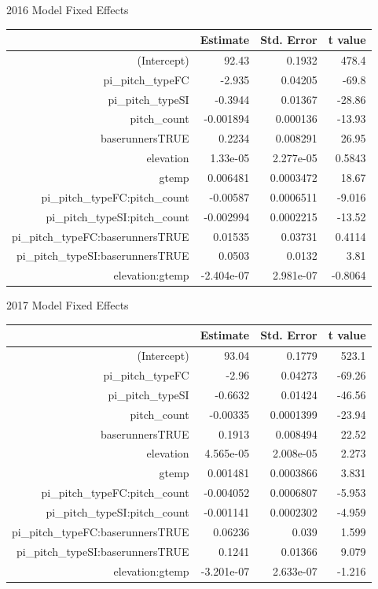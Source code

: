 \documentclass[letterpaper,12pt]{article}\usepackage[]{graphicx}\usepackage[]{color}
\begin{document}
2016 Model Fixed Effects
\begin{table}[ht]
\centering
\begin{tabular}{rrrr}
  \hline
 & Estimate & Std. Error & t value \\ 
  \hline
(Intercept) & 92.43 & 0.1932 & 478.4 \\ 
  pi\_pitch\_typeFC & -2.935 & 0.04205 & -69.8 \\ 
  pi\_pitch\_typeSI & -0.3944 & 0.01367 & -28.86 \\ 
  pitch\_count & -0.001894 & 0.000136 & -13.93 \\ 
  baserunnersTRUE & 0.2234 & 0.008291 & 26.95 \\ 
  elevation & 1.33e-05 & 2.277e-05 & 0.5843 \\ 
  gtemp & 0.006481 & 0.0003472 & 18.67 \\ 
  pi\_pitch\_typeFC:pitch\_count & -0.00587 & 0.0006511 & -9.016 \\ 
  pi\_pitch\_typeSI:pitch\_count & -0.002994 & 0.0002215 & -13.52 \\ 
  pi\_pitch\_typeFC:baserunnersTRUE & 0.01535 & 0.03731 & 0.4114 \\ 
  pi\_pitch\_typeSI:baserunnersTRUE & 0.0503 & 0.0132 &  3.81 \\ 
  elevation:gtemp & -2.404e-07 & 2.981e-07 & -0.8064 \\ 
   \hline
\end{tabular}
\end{table}

2017 Model Fixed Effects
\begin{table}[ht]
\centering
\begin{tabular}{rrrr}
  \hline
 & Estimate & Std. Error & t value \\ 
  \hline
(Intercept) & 93.04 & 0.1779 & 523.1 \\ 
  pi\_pitch\_typeFC & -2.96 & 0.04273 & -69.26 \\ 
  pi\_pitch\_typeSI & -0.6632 & 0.01424 & -46.56 \\ 
  pitch\_count & -0.00335 & 0.0001399 & -23.94 \\ 
  baserunnersTRUE & 0.1913 & 0.008494 & 22.52 \\ 
  elevation & 4.565e-05 & 2.008e-05 & 2.273 \\ 
  gtemp & 0.001481 & 0.0003866 & 3.831 \\ 
  pi\_pitch\_typeFC:pitch\_count & -0.004052 & 0.0006807 & -5.953 \\ 
  pi\_pitch\_typeSI:pitch\_count & -0.001141 & 0.0002302 & -4.959 \\ 
  pi\_pitch\_typeFC:baserunnersTRUE & 0.06236 & 0.039 & 1.599 \\ 
  pi\_pitch\_typeSI:baserunnersTRUE & 0.1241 & 0.01366 & 9.079 \\ 
  elevation:gtemp & -3.201e-07 & 2.633e-07 & -1.216 \\ 
   \hline
\end{tabular}
\end{table}
\end{document}
